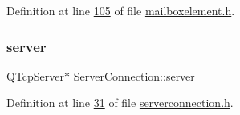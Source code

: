 Definition at line \hyperlink{a00002_source_l00105}{105} of file \hyperlink{a00002_source}{mailboxelement.\+h}.

\mbox{\label{a00181_aee9a8e6c0f1d25fc2fcb4662631c0c74}} 
\subsubsection{\texorpdfstring{server}{server}}
{\footnotesize\ttfamily Q\+Tcp\+Server$\ast$ Server\+Connection\+::server\hspace{0.3cm}{\ttfamily [protected]}}



Definition at line \hyperlink{a00104_source_l00031}{31} of file \hyperlink{a00104_source}{serverconnection.\+h}.

